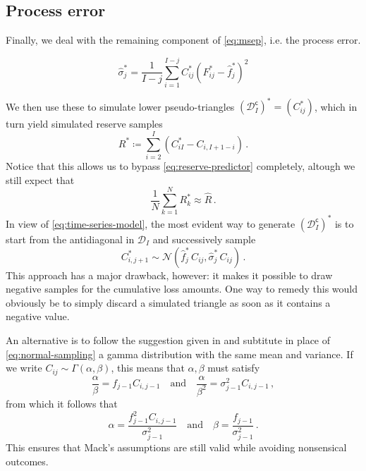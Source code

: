\documentclass[a4paper]{book}
\theoremstyle{plain}
\begin{document}
\subsection{Process error}

Finally, we deal with the remaining component of \cref{eq:msep}, i.e. the process error.

\begin{equation}
    \hat{\sigma}^*_j = \frac{1}{I-j}\sum_{i=1}^{I-j} C^*_{ij}\left( F^*_{ij} - \hat{f}^*_j \right)^2
\end{equation}

We then use these to simulate lower pseudo-triangles $(\mathcal{D}^{\mathsf{c}}_I)^* = (C^*_{ij})$, which in turn yield simulated reserve samples
\begin{equation}
    R^* \coloneqq \sum_{i = 2}^I (C^*_{iI} - C_{i, I + 1 - i}) \,.
\end{equation}
Notice that this allows us to bypass \eqref{eq:reserve-predictor} completely, altough we still expect that
\begin{equation}
    \frac{1}{N} \sum_{k = 1}^N R^*_k \approx \hat{R} \,.
\end{equation}
In view of \eqref{eq:time-series-model}, the most evident way to generate $(\mathcal{D}^{\mathsf{c}}_I)^*$ is to start from the antidiagonal in $\mathcal{D}_I$ and successively sample
\begin{equation} \label{eq:normal-sampling}
    C^*_{i, j + 1} \sim \mathcal{N}(\hat{f}^*_j \, C_{ij}, \hat{\sigma}^*_j \, C_{ij}) \,.
\end{equation}
This approach has a major drawback, however: it makes it possible to draw negative samples for the cumulative loss amounts. One way to remedy this would obviously be to simply discard a simulated triangle as soon as it contains a negative value. 

An alternative is to follow the suggestion given in \cite[238]{england:dist} and subtitute in place of \eqref{eq:normal-sampling} a gamma distribution with the same mean and variance. If we write $C_{ij} \sim \Gamma(\alpha, \beta)$, this means that $\alpha, \beta$ must satisfy
\begin{equation}
\frac{\alpha}{\beta} = f_{j-1} C_{i, j-1} \quad \text{and} \quad \frac{\alpha}{\beta^2} = \sigma^2_{j-1} C_{i, j-1} \,,
\end{equation}
from which it follows that
\begin{equation}
\alpha = \frac{f_{j-1}^2 C_{i, j-1}}{\sigma_{j-1}^2} \quad \text{and} \quad \beta = \frac{f_{j-1}}{\sigma_{j-1}^2} \,.
\end{equation}
This ensures that Mack's assumptions are still valid while avoiding nonsensical outcomes.
\end{document}
